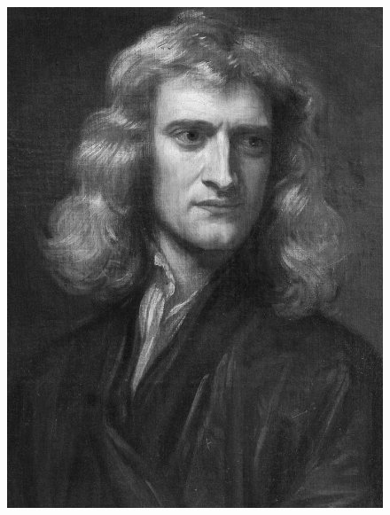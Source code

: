 \documentclass[crop=false]{standalone}
\begin{document}
\begin{figure}[H]
    \includegraphics[width=\linewidth]{images/isaac-newton.jpg}
  \endminipage
  \vspace{1,25cm}
\end{figure}
\end{document}
